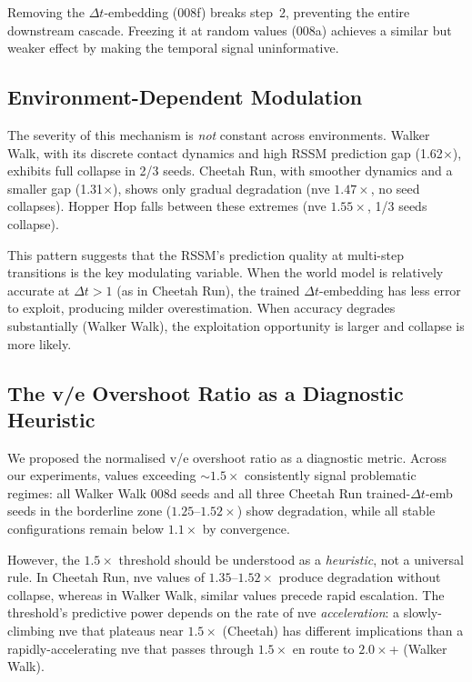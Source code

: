 \documentclass[letterpaper]{article}
\begin{document}
Removing the $\Delta t$-embedding (008f) breaks step~2, preventing the entire downstream cascade.
Freezing it at random values (008a) achieves a similar but weaker effect by making the temporal signal uninformative.

\subsection{Environment-Dependent Modulation}

The severity of this mechanism is \emph{not} constant across environments.
Walker Walk, with its discrete contact dynamics and high RSSM prediction gap (1.62$\times$), exhibits full collapse in 2/3 seeds.
Cheetah Run, with smoother dynamics and a smaller gap (1.31$\times$), shows only gradual degradation (nve $1.47\times$, no seed collapses).
Hopper Hop falls between these extremes (nve $1.55\times$, 1/3 seeds collapse).

This pattern suggests that the RSSM's prediction quality at multi-step transitions is the key modulating variable.
When the world model is relatively accurate at $\Delta t{>}1$ (as in Cheetah Run), the trained $\Delta t$-embedding has less error to exploit, producing milder overestimation.
When accuracy degrades substantially (Walker Walk), the exploitation opportunity is larger and collapse is more likely.

\subsection{The v/e Overshoot Ratio as a Diagnostic Heuristic}

We proposed the normalised v/e overshoot ratio as a diagnostic metric.
Across our experiments, values exceeding ${\sim}1.5\times$ consistently signal problematic regimes:
all Walker Walk 008d seeds and all three Cheetah Run trained-$\Delta t$-emb seeds in the borderline zone ($1.25$--$1.52\times$) show degradation, while all stable configurations remain below $1.1\times$ by convergence.

However, the $1.5\times$ threshold should be understood as a \emph{heuristic}, not a universal rule.
In Cheetah Run, nve values of $1.35$--$1.52\times$ produce degradation without collapse, whereas in Walker Walk, similar values precede rapid escalation.
The threshold's predictive power depends on the rate of nve \emph{acceleration}: a slowly-climbing nve that plateaus near $1.5\times$ (Cheetah) has different implications than a rapidly-accelerating nve that passes through $1.5\times$ en route to $2.0\times$+ (Walker Walk).
\end{document}
